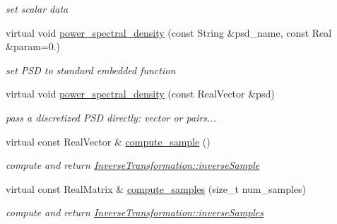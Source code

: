 \begin{DoxyCompactItemize}
\begin{DoxyCompactList}\small\item\em set scalar data \end{DoxyCompactList}\item 
virtual void \hyperlink{classPecos_1_1DataTransformation_a2f54b6bae76157d4a964cd3ff73e4947}{power\+\_\+spectral\+\_\+density} (const String \&psd\+\_\+name, const Real \&param=0.)\label{classPecos_1_1DataTransformation_a2f54b6bae76157d4a964cd3ff73e4947}

\begin{DoxyCompactList}\small\item\em set P\+SD to standard embedded function \end{DoxyCompactList}\item 
virtual void \hyperlink{classPecos_1_1DataTransformation_a04ee7e5995c5c5fcc14419e39880319b}{power\+\_\+spectral\+\_\+density} (const Real\+Vector \&psd)\label{classPecos_1_1DataTransformation_a04ee7e5995c5c5fcc14419e39880319b}

\begin{DoxyCompactList}\small\item\em pass a discretized P\+SD directly\+: vector or pairs... \end{DoxyCompactList}\item 
virtual const Real\+Vector \& \hyperlink{classPecos_1_1DataTransformation_a1e56233ae21533f04a96a94d7fa96786}{compute\+\_\+sample} ()\label{classPecos_1_1DataTransformation_a1e56233ae21533f04a96a94d7fa96786}

\begin{DoxyCompactList}\small\item\em compute and return \hyperlink{classPecos_1_1InverseTransformation_a17018c54acd67607b74c8783997d43a9}{Inverse\+Transformation\+::inverse\+Sample} \end{DoxyCompactList}\item 
virtual const Real\+Matrix \& \hyperlink{classPecos_1_1DataTransformation_a10313f12f462fedfb0264b6dc36b5873}{compute\+\_\+samples} (size\+\_\+t num\+\_\+samples)\label{classPecos_1_1DataTransformation_a10313f12f462fedfb0264b6dc36b5873}

\begin{DoxyCompactList}\small\item\em compute and return \hyperlink{classPecos_1_1InverseTransformation_ab9922b4f4d5024622225f70ea343f9ee}{Inverse\+Transformation\+::inverse\+Samples} \end{DoxyCompactList}\end{DoxyCompactItemize}

